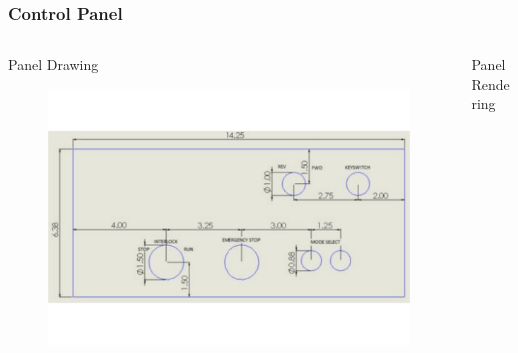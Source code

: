\documentclass{beamer}
\begin{document}
\begin{frame}
	\frametitle{Control Panel}
	\begin{columns}[T]
		\begin{column}{0.5\textwidth}
			\begin{block}{Panel Drawing}
				\begin{figure}
					\centering 
					\includegraphics[scale=.18]{figures/panel2.pdf} 
				\end{figure}
			\end{block}
		\end{column}		
		\begin{column}{0.5\textwidth}
			\begin{block}{Panel Rendering}
				\begin{figure}
					\centering

\end{figure}
\end{block}
\end{column}
\end{columns}
\end{frame}
\end{document}
